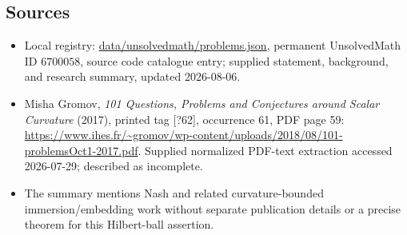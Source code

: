 \documentclass[11pt]{article}
\begin{document}
\subsection{Sources}
\begin{itemize}
\item Local registry: \url{data/unsolvedmath/problems.json}, permanent UnsolvedMath ID \(6700058\), source code catalogue entry; supplied statement, background, and research summary, updated 2026-08-06.
\item Misha Gromov, \emph{101 Questions, Problems and Conjectures around Scalar Curvature} (2017), printed tag [?62], occurrence 61, PDF page 59: \url{https://www.ihes.fr/~gromov/wp-content/uploads/2018/08/101-problemsOct1-2017.pdf}. Supplied normalized PDF-text extraction accessed 2026-07-29; described as incomplete.
\item The summary mentions Nash and related curvature-bounded immersion/embedding work without separate publication details or a precise theorem for this Hilbert-ball assertion.
\end{itemize}
\end{document}
